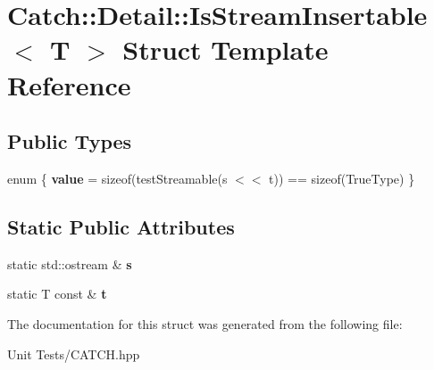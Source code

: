 \hypertarget{structCatch_1_1Detail_1_1IsStreamInsertable}{}\section{Catch\+:\+:Detail\+:\+:Is\+Stream\+Insertable$<$ T $>$ Struct Template Reference}
\label{structCatch_1_1Detail_1_1IsStreamInsertable}
\subsection*{Public Types}
\begin{DoxyCompactItemize}
\item 
enum \{ {\bfseries value} = sizeof(test\+Streamable(s $<$$<$ t)) == sizeof(True\+Type)
 \}\hypertarget{structCatch_1_1Detail_1_1IsStreamInsertable_acb41cf4cda793be95dbda63bbea8a721}{}\label{structCatch_1_1Detail_1_1IsStreamInsertable_acb41cf4cda793be95dbda63bbea8a721}

\end{DoxyCompactItemize}
\subsection*{Static Public Attributes}
\begin{DoxyCompactItemize}
\item 
static std\+::ostream \& {\bfseries s}\hypertarget{structCatch_1_1Detail_1_1IsStreamInsertable_abe3d3c8e5d85665747faafffc9a96b00}{}\label{structCatch_1_1Detail_1_1IsStreamInsertable_abe3d3c8e5d85665747faafffc9a96b00}

\item 
static T const \& {\bfseries t}\hypertarget{structCatch_1_1Detail_1_1IsStreamInsertable_a7d2a3da978b6736667a7b2f6d51f507f}{}\label{structCatch_1_1Detail_1_1IsStreamInsertable_a7d2a3da978b6736667a7b2f6d51f507f}

\end{DoxyCompactItemize}


The documentation for this struct was generated from the following file\+:\begin{DoxyCompactItemize}
\item 
Unit Tests/C\+A\+T\+C\+H.\+hpp\end{DoxyCompactItemize}

